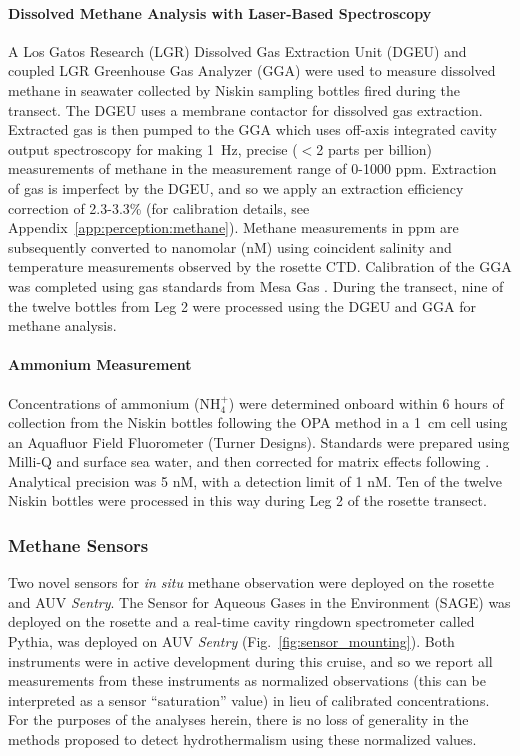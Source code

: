 \paragraph{Dissolved Methane Analysis with Laser-Based Spectroscopy}
A Los Gatos Research (LGR) Dissolved Gas Extraction Unit (DGEU) and coupled LGR Greenhouse Gas Analyzer (GGA) were used to measure dissolved methane in seawater collected by Niskin sampling bottles fired during the transect. The DGEU uses a membrane contactor for dissolved gas extraction. Extracted gas is then pumped to the GGA which uses off-axis integrated cavity output spectroscopy for making \SI{1}{\hertz}, precise ($<$2 parts per billion) measurements of methane in the measurement range of 0-1000 ppm. Extraction of gas is imperfect by the DGEU, and so we apply an extraction efficiency correction of 2.3-3.3\% (for calibration details, see Appendix~\ref{app:perception:methane}). Methane measurements in ppm are subsequently converted to nanomolar (nM) using coincident salinity and temperature measurements observed by the rosette CTD. Calibration of the GGA was completed using gas standards from Mesa Gas \cite{michel2021observations}. During the transect, nine of the twelve bottles from Leg 2 were processed using the DGEU and GGA for methane analysis.

\paragraph{Ammonium Measurement}
Concentrations of ammonium (NH$_4^+$) were determined onboard within 6 hours of collection from the Niskin bottles following the OPA method \cite{holmes1999simple} in a \SI{1}{\centi\meter} cell using an Aquafluor Field Fluorometer (Turner Designs). Standards were prepared using Milli-Q and surface sea water, and then corrected for matrix effects following \cite{taylor2007improving}. Analytical precision was 5 nM, with a detection limit of 1 nM. Ten of the twelve Niskin bottles were processed in this way during Leg 2 of the rosette transect.

\subsubsection{Methane Sensors}
Two novel sensors for \emph{in situ} methane observation were deployed on the rosette and AUV \emph{Sentry}. The Sensor for Aqueous Gases in the Environment (SAGE) was deployed on the rosette and a real-time cavity ringdown spectrometer called Pythia, was deployed on AUV \emph{Sentry} (Fig.~\ref{fig:sensor_mounting}). Both instruments were in active development during this cruise, and so we report all measurements from these instruments as normalized observations (this can be interpreted as a sensor ``saturation'' value) in lieu of calibrated concentrations. For the purposes of the analyses herein, there is no loss of generality in the methods proposed to detect hydrothermalism using these normalized values.

